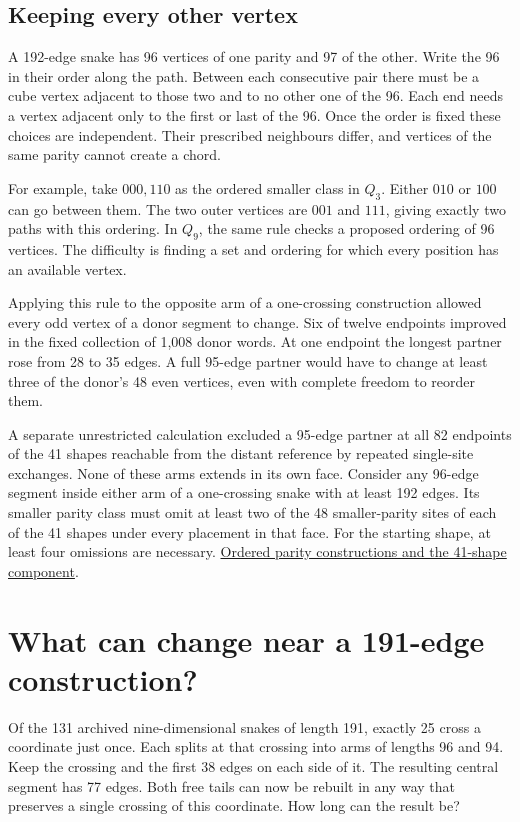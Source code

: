 \documentclass[11pt,a4paper]{article}
\begin{document}
\subsection{Keeping every other vertex}
A 192-edge snake has 96 vertices of one parity and 97 of the other.
Write the 96 in their order along the path. Between each consecutive
pair there must be a cube vertex adjacent to those two and to no other
one of the 96. Each end needs a vertex adjacent only to the first
or last of the 96. Once the order is fixed these choices are
independent. Their prescribed neighbours differ, and vertices of
the same parity cannot create a chord.

For example, take \(000,110\) as the ordered smaller class in
\(Q_3\). Either \(010\) or \(100\) can go between them. The two
outer vertices are \(001\) and \(111\), giving exactly two paths with
this ordering. In \(Q_9\), the same rule checks a proposed ordering of
96 vertices. The difficulty is finding a set and ordering for which
every position has an available vertex.

Applying this rule to the opposite arm of a one-crossing construction
allowed every odd vertex of a donor segment to change. Six of twelve
endpoints improved in the fixed collection of 1,008 donor words. At one
endpoint the longest partner rose from 28 to 35 edges. A full 95-edge
partner would have to change at least three of the donor's 48 even
vertices, even with complete freedom to reorder them.

A separate unrestricted calculation excluded a 95-edge partner at
all 82 endpoints of the 41 shapes reachable from the distant reference
by repeated single-site exchanges. None of these arms extends in its
own face. Consider any 96-edge segment inside either arm of a
one-crossing snake with at least 192 edges. Its smaller parity class
must omit at least two of the 48 smaller-parity sites of each of the
41 shapes under every placement in that face. For the starting shape,
at least four omissions are necessary.
\href{https://github.com/hironaka-iori/Snake-in-the-box-in-9/tree/main/milestones/264-distant-component}{Ordered parity constructions and the 41-shape component}.

\section{What can change near a 191-edge construction?}
Of the 131 archived nine-dimensional snakes of length 191, exactly 25
cross a coordinate just once. Each splits at that crossing into arms
of lengths 96 and 94. Keep the crossing and the first 38 edges on each
side of it. The resulting central segment has 77 edges. Both free tails
can now be rebuilt in any way that preserves a single crossing of this
coordinate. How long can the result be?
\end{document}
